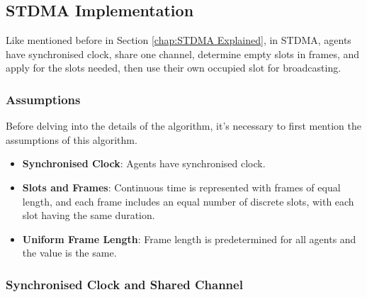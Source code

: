 \subsection{STDMA Implementation}
\label{chap:STDMA Implementation}

Like mentioned before in Section \ref{chap:STDMA Explained}, in STDMA, agents have synchronised clock, share one channel, determine empty slots in frames, and apply for the slots needed, then use their own occupied slot for broadcasting.

\subsubsection{Assumptions}


Before delving into the details of the algorithm, it's necessary to first mention the assumptions of this algorithm.

\begin{itemize}
    \item \textbf{Synchronised Clock}: Agents have synchronised clock.
    \item \textbf{Slots and Frames}: Continuous time is represented with frames of equal length, and each frame includes an equal number of discrete slots, with each slot having the same duration.
    \item \textbf{Uniform Frame Length}: Frame length is predetermined for all agents and the value is the same.
\end{itemize}


\subsubsection{Synchronised Clock and Shared Channel}

